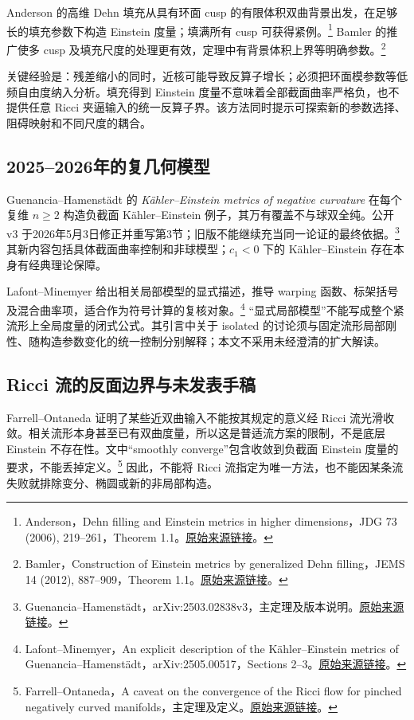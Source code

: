 \documentclass[11pt,a4paper]{article}
\theoremstyle{definition}
\newcommand{\src}[3]{\footnote{\raggedright #1，#2。\href{#3}{原始来源链接}。}}
\begin{document}
Anderson 的高维 Dehn 填充从具有环面 cusp 的有限体积双曲背景出发，在足够长的填充参数下构造 Einstein 度量；填满所有 cusp 可获得紧例。\src{Anderson}{Dehn filling and Einstein metrics in higher dimensions，JDG 73 (2006), 219--261，Theorem 1.1}{https://www.math.stonybrook.edu/~anderson/dehn.pdf}
Bamler 的推广使多 cusp 及填充尺度的处理更有效，定理中有背景体积上界等明确参数。\src{Bamler}{Construction of Einstein metrics by generalized Dehn filling，JEMS 14 (2012), 887--909，Theorem 1.1}{https://arxiv.org/abs/0911.4730v2}

关键经验是：残差缩小的同时，近核可能导致反算子增长；必须把环面模参数等低频自由度纳入分析。填充得到 Einstein 度量不意味着全部截面曲率严格负，也不提供任意 Ricci 夹逼输入的统一反算子界。该方法同时提示可探索新的参数选择、阻碍映射和不同尺度的耦合。

\subsection{2025--2026年的复几何模型}

Guenancia--Hamenstädt 的 \emph{Kähler--Einstein metrics of negative curvature} 在每个复维 $n\ge2$ 构造负截面 Kähler--Einstein 例子，其万有覆盖不与球双全纯。公开 v3 于2026年5月3日修正并重写第3节；旧版不能继续充当同一论证的最终依据。\src{Guenancia--Hamenstädt}{arXiv:2503.02838v3，主定理及版本说明}{https://arxiv.org/abs/2503.02838v3}
其新内容包括具体截面曲率控制和非球模型；$c_1<0$ 下的 Kähler--Einstein 存在本身有经典理论保障。

Lafont--Minemyer 给出相关局部模型的显式描述，推导 warping 函数、标架括号及混合曲率项，适合作为符号计算的复核对象。\src{Lafont--Minemyer}{An explicit description of the Kähler--Einstein metrics of Guenancia--Hamenstädt，arXiv:2505.00517，Sections 2--3}{https://arxiv.org/abs/2505.00517}
“显式局部模型”不能写成整个紧流形上全局度量的闭式公式。其引言中关于 isolated 的讨论须与固定流形局部刚性、随构造参数变化的统一控制分别解释；本文不采用未经澄清的扩大解读。

\subsection{Ricci 流的反面边界与未发表手稿}

Farrell--Ontaneda 证明了某些近双曲输入不能按其规定的意义经 Ricci 流光滑收敛。相关流形本身甚至已有双曲度量，所以这是普适流方案的限制，不是底层 Einstein 不存在性。文中“smoothly converge”包含收敛到负截面 Einstein 度量的要求，不能丢掉定义。\src{Farrell--Ontaneda}{A caveat on the convergence of the Ricci flow for pinched negatively curved manifolds，主定理及定义}{https://arxiv.org/abs/math/0311176v2}
因此，不能将 Ricci 流指定为唯一方法，也不能因某条流失败就排除变分、椭圆或新的非局部构造。
\end{document}
